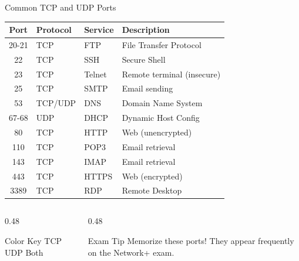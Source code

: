 \documentclass[aspectratio=169, 11pt]{beamer}
\begin{document}
\begin{frame}{Common TCP and UDP Ports}
    \begin{center}
        \small
        \begin{tabular}{c l l l}
            \toprule
            \textbf{Port} & \textbf{Protocol} & \textbf{Service} & \textbf{Description} \\
            \midrule
            \rowcolor{tcpblue!10} 20-21 & TCP & FTP & File Transfer Protocol \\
            \rowcolor{tcpblue!10} 22 & TCP & SSH & Secure Shell \\
            \rowcolor{tcpblue!10} 23 & TCP & Telnet & Remote terminal (insecure) \\
            \rowcolor{tcpblue!10} 25 & TCP & SMTP & Email sending \\
            \rowcolor{udpgreen!15} 53 & TCP/UDP & DNS & Domain Name System \\
            \rowcolor{udpgreen!10} 67-68 & UDP & DHCP & Dynamic Host Config \\
            \rowcolor{tcpblue!10} 80 & TCP & HTTP & Web (unencrypted) \\
            \rowcolor{tcpblue!10} 110 & TCP & POP3 & Email retrieval \\
            \rowcolor{tcpblue!10} 143 & TCP & IMAP & Email retrieval \\
            \rowcolor{tcpblue!10} 443 & TCP & HTTPS & Web (encrypted) \\
            \rowcolor{tcpblue!10} 3389 & TCP & RDP & Remote Desktop \\
            \bottomrule
        \end{tabular}
    \end{center}
    
    \vspace{0.3em}
    \begin{columns}[T]
        \begin{column}{0.48\textwidth}
            \begin{block}{Color Key}
                \small
                \colorbox{tcpblue!10}{TCP} \quad \colorbox{udpgreen!10}{UDP} \quad \colorbox{udpgreen!15}{Both}
            \end{block}
        \end{column}
        \begin{column}{0.48\textwidth}
            \begin{alertblock}{Exam Tip}
                \small
                Memorize these ports! They appear frequently on the Network+ exam.
            \end{alertblock}
        \end{column}
    \end{columns}
\end{frame}
\end{document}
